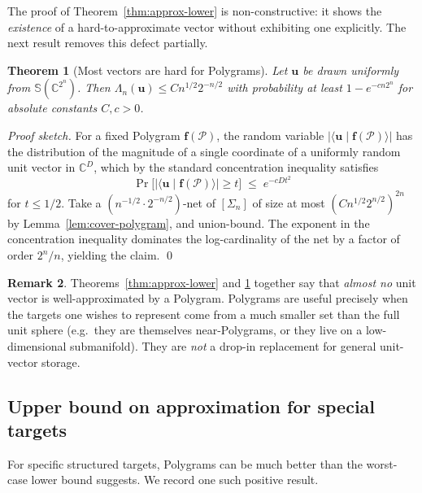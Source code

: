 \documentclass[11pt,letterpaper]{article}
\newtheorem{theorem}{Theorem}[section]
\theoremstyle{definition}
\newtheorem{remark}[theorem]{Remark}
\newcommand{\C}{\mathbb{C}}
\newcommand{\Sphere}{\mathbb{S}}
\newcommand{\Polygram}{\mathcal{P}}
\newcommand{\inner}[2]{\langle #1 \mid #2 \rangle}
\newcommand{\abs}[1]{\lvert #1 \rvert}
\begin{document}
The proof of Theorem~\ref{thm:approx-lower} is non-constructive: it shows the
\emph{existence} of a hard-to-approximate vector without exhibiting one
explicitly. The next result removes this defect partially.

\begin{theorem}[Most vectors are hard for Polygrams]
\label{thm:typical-hard}
Let $\bm{u}$ be drawn uniformly from $\Sphere(\C^{2^{n}})$. Then
$\Lambda_{n}(\bm{u}) \leq C n^{1/2} 2^{-n/2}$ with probability at least
$1 - e^{-cn 2^{n}}$ for absolute constants $C, c > 0$.
\end{theorem}

\begin{proof}[Proof sketch]
For a fixed Polygram $\bm{f}(\Polygram)$, the random variable
$\abs{\inner{\bm{u}}{\bm{f}(\Polygram)}}$ has the distribution of the magnitude
of a single coordinate of a uniformly random unit vector in $\C^{D}$, which by
the standard concentration inequality satisfies
\[
\Pr\!\big[\abs{\inner{\bm{u}}{\bm{f}(\Polygram)}} \geq t\big]
   \;\leq\; e^{-c D t^{2}}
\]
for $t \leq 1/2$. Take a $(n^{-1/2} \cdot 2^{-n/2})$-net of $[\Sigma_{n}]$ of
size at most $(C n^{1/2} 2^{n/2})^{2n}$ by
Lemma~\ref{lem:cover-polygram}, and union-bound. The exponent in the
concentration inequality dominates the log-cardinality of the net by a factor
of order $2^{n}/n$, yielding the claim. \qed
\end{proof}

\begin{remark}
Theorems~\ref{thm:approx-lower} and \ref{thm:typical-hard} together say that
\emph{almost no} unit vector is well-approximated by a Polygram. Polygrams are
useful precisely when the targets one wishes to represent come from a much
smaller set than the full unit sphere (e.g.\ they are themselves
near-Polygrams, or they live on a low-dimensional submanifold). They are
\emph{not} a drop-in replacement for general unit-vector storage.
\end{remark}

\subsection{Upper bound on approximation for special targets}

For specific structured targets, Polygrams can be much better than the
worst-case lower bound suggests. We record one such positive result.
\end{document}
